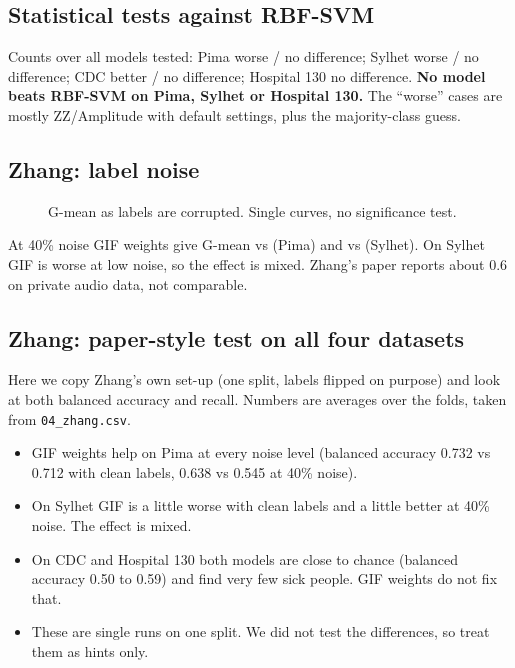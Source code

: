 \documentclass[11pt,a4paper]{article}
\begin{document}
\subsection{Statistical tests against RBF-SVM}
\begin{table}[H]\centering\scriptsize\caption{Paired tests on balanced accuracy (Nadeau--Bengio, Holm-adjusted per dataset). ``Better'' on CDC means better than a plain RBF-SVM that finds almost no positives; the cause is class weighting, not the quantum or classical type.}
\end{table}
Counts over all models tested: Pima \npimaworse{} worse / \npimaNS{} no difference; Sylhet \nsylhetworse{} worse / \nsylhetNS{} no difference; CDC \ncdcbetter{} better / \ncdcNS{} no difference; Hospital 130 \nhospNS{} no difference. \textbf{No model beats RBF-SVM on Pima, Sylhet or Hospital 130.} The ``worse'' cases are mostly ZZ/Amplitude with default settings, plus the majority-class guess.

\subsection{Zhang: label noise}
\begin{figure}[H]\centering\caption{G-mean as labels are corrupted. Single curves, no significance test.}\end{figure}
At 40\% noise GIF weights give G-mean \zhpimaLightGBMGIFweights{} vs \zhpimaLightGBM{} (Pima) and \zhsylhetLightGBMGIFweights{} vs \zhsylhetLightGBM{} (Sylhet). On Sylhet GIF is worse at low noise, so the effect is mixed. Zhang's paper reports about 0.6 on private audio data, not comparable.

\subsection{Zhang: paper-style test on all four datasets}
Here we copy Zhang's own set-up (one split, labels flipped on purpose) and look at both balanced accuracy and recall. Numbers are averages over the folds, taken from \texttt{04\_zhang.csv}.
\begin{table}[H]\centering\small\caption{Zhang, paper-style test. Plain LightGBM vs LightGBM with GIF weights, when 0\%, 20\% or 40\% of the training labels are wrong.}
\end{table}
\begin{itemize}[leftmargin=1.5em]
\item GIF weights help on Pima at every noise level (balanced accuracy 0.732 vs 0.712 with clean labels, 0.638 vs 0.545 at 40\% noise).
\item On Sylhet GIF is a little worse with clean labels and a little better at 40\% noise. The effect is mixed.
\item On CDC and Hospital 130 both models are close to chance (balanced accuracy 0.50 to 0.59) and find very few sick people. GIF weights do not fix that.
\item These are single runs on one split. We did not test the differences, so treat them as hints only.
\end{itemize}
\end{document}
